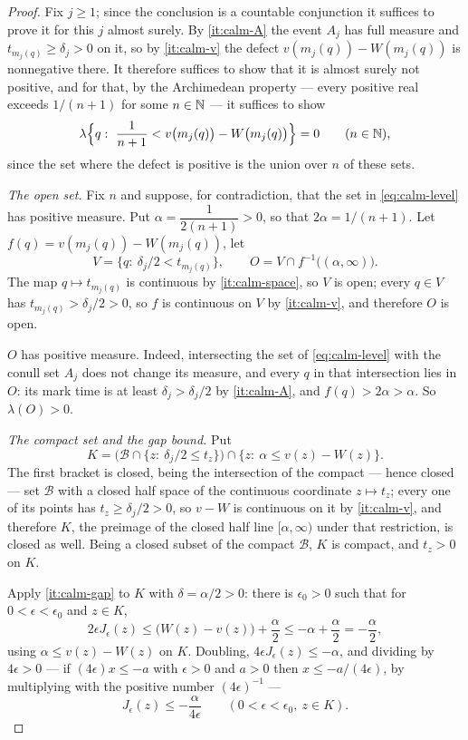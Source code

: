 \begin{proof}
Fix $j\ge1$; since the conclusion is a countable conjunction it suffices to
prove it for this $j$ almost surely. By \ref{it:calm-A} the event $A_j$ has
full measure and $t_{m_j(q)}\ge\delta_j>0$ on it, so by \ref{it:calm-v} the
defect $v(m_j(q))-W(m_j(q))$ is nonnegative there. It therefore suffices to
show that it is almost surely not positive, and for that, by the Archimedean
property --- every positive real exceeds $1/(n+1)$ for some $n\in\mathbb{N}$ --- it
suffices to show
\begin{equation}\label{eq:calm-level}
  \lambda\Bigl\{q:\ \frac1{n+1}<v\bigl(m_j(q)\bigr)-W\bigl(m_j(q)\bigr)\Bigr\}=0
  \qquad(n\in\N),
\end{equation}
since the set where the defect is positive is the union over $n$ of these sets.

\emph{The open set.} Fix $n$ and suppose, for contradiction, that the set in
\eqref{eq:calm-level} has positive measure. Put $\alpha=\dfrac1{2(n+1)}>0$, so
that $2\alpha=1/(n+1)$. Let $f(q)=v(m_j(q))-W(m_j(q))$, let
\[
  V=\bigl\{q:\ \delta_j/2<t_{m_j(q)}\bigr\},
  \qquad
  O=V\cap f^{-1}\bigl((\alpha,\infty)\bigr).
\]
The map $q\mapsto t_{m_j(q)}$ is continuous by \ref{it:calm-space}, so $V$ is
open; every $q\in V$ has $t_{m_j(q)}>\delta_j/2>0$, so $f$ is continuous on
$V$ by \ref{it:calm-v}, and therefore $O$ is open.

$O$ has positive measure. Indeed, intersecting the set of
\eqref{eq:calm-level} with the conull set $A_j$ does not change its measure,
and every $q$ in that intersection lies in $O$: its mark time is at least
$\delta_j>\delta_j/2$ by \ref{it:calm-A}, and $f(q)>2\alpha>\alpha$. So
$\lambda(O)>0$.

\emph{The compact set and the gap bound.} Put
\[
  K=\bigl(\mathcal B\cap\{z:\ \delta_j/2\le t_z\}\bigr)
     \cap\{z:\ \alpha\le v(z)-W(z)\} .
\]
The first bracket is closed, being the intersection of the compact --- hence
closed --- set $\mathcal B$ with a closed half space of the continuous
coordinate $z\mapsto t_z$; every one of its points has $t_z\ge\delta_j/2>0$,
so $v-W$ is continuous on it by \ref{it:calm-v}, and therefore $K$, the
preimage of the closed half line $[\alpha,\infty)$ under that restriction, is
closed as well. Being a closed subset of the compact $\mathcal B$, $K$ is
compact, and $t_z>0$ on $K$.

Apply \ref{it:calm-gap} to $K$ with $\delta=\alpha/2>0$: there is
$\epsilon_0>0$ such that for $0<\epsilon<\epsilon_0$ and $z\in K$,
\[
  2\epsilon J_\epsilon(z)\le\bigl(W(z)-v(z)\bigr)+\frac\alpha2
   \le-\alpha+\frac\alpha2=-\frac\alpha2 ,
\]
using $\alpha\le v(z)-W(z)$ on $K$. Doubling, $4\epsilon J_\epsilon(z)\le-\alpha$,
and dividing by $4\epsilon>0$ --- if $(4\epsilon)x\le-a$ with $\epsilon>0$ and
$a>0$ then $x\le-a/(4\epsilon)$, by multiplying with the positive number
$(4\epsilon)^{-1}$ ---
\begin{equation}\label{eq:calm-verynegative}
  J_\epsilon(z)\le-\frac{\alpha}{4\epsilon}
  \qquad(0<\epsilon<\epsilon_0,\ z\in K).
\end{equation}


\end{proof}

